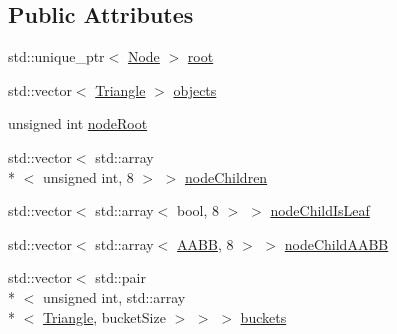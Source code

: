 \subsection*{Public Attributes}
\begin{DoxyCompactItemize}
\item 
std\-::unique\-\_\-ptr$<$ \hyperlink{structphysics_1_1OctreeT_1_1Node}{Node} $>$ \hyperlink{classphysics_1_1OctreeT_a268eb1b03538379bc0eecfe0d72a668c}{root}
\item 
std\-::vector$<$ \hyperlink{structphysics_1_1Triangle}{Triangle} $>$ \hyperlink{classphysics_1_1OctreeT_a4d8129f4786cc7cae4a6473b71419eba}{objects}
\item 
unsigned int \hyperlink{classphysics_1_1OctreeT_abe59395a4f9b0cdb0dfbd73ad5a2d52c}{node\-Root}
\item 
std\-::vector$<$ std\-::array\\*
$<$ unsigned int, 8 $>$ $>$ \hyperlink{classphysics_1_1OctreeT_a7ff3ce7346a421ad4619a837c4fafc61}{node\-Children}
\item 
std\-::vector$<$ std\-::array$<$ bool, 8 $>$ $>$ \hyperlink{classphysics_1_1OctreeT_acec9534e74150f0cd93dc24256e324f6}{node\-Child\-Is\-Leaf}
\item 
std\-::vector$<$ std\-::array$<$ \hyperlink{structphysics_1_1AABB}{A\-A\-B\-B}, 8 $>$ $>$ \hyperlink{classphysics_1_1OctreeT_a20d242370208fa365b2fabedee4d005e}{node\-Child\-A\-A\-B\-B}
\item 
std\-::vector$<$ std\-::pair\\*
$<$ unsigned int, std\-::array\\*
$<$ \hyperlink{structphysics_1_1Triangle}{Triangle}, bucket\-Size $>$ $>$ $>$ \hyperlink{classphysics_1_1OctreeT_ac01b644236033dec94c0ede8dcea2dda}{buckets}
\end{DoxyCompactItemize}


